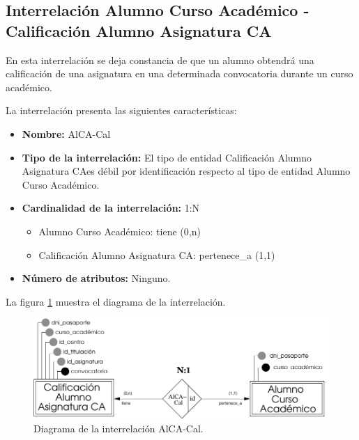 \subsection{Interrelación Alumno Curso Académico - Calificación Alumno
            Asignatura CA}

   \begin{description}
      \item[Definición] En esta interrelación se deja constancia de que un
      alumno obtendrá una calificación de una asignatura en una determinada
      convocatoria durante un curso académico.

      \item[Características] La interrelación presenta las siguientes
                             características:

         \begin{itemize}
            \item \textbf{Nombre:} AlCA-Cal
            \item \textbf{Tipo de la interrelación:} El tipo de entidad
                  Calificación Alumno Asignatura CAes débil por identificación
                  respecto al tipo de entidad Alumno Curso Académico.
            \item \textbf{Cardinalidad de la interrelación:} 1:N
                  \begin{itemize}
                     \item Alumno Curso Académico: tiene (0,n)
                     \item Calificación Alumno Asignatura CA: pertenece\_a (1,1)
                  \end{itemize}
            \item \textbf{Número de atributos:} Ninguno.
         \end{itemize}

      \item[Diagrama] La figura \ref{diagramaAlCA-Cal} muestra el diagrama de la
                      interrelación.

      \item \begin{figure}[!ht]
            \begin{center}
            \includegraphics[]{07.Modelo_Entidad-Interrelacion/7.3.Analisis_Interrelaciones/diagramas/AlCA-Cal.pdf}
            \caption{Diagrama de la interrelación AlCA-Cal.}
            \label{diagramaAlCA-Cal}
            \end{center}
         \end{figure}


\end{description}
